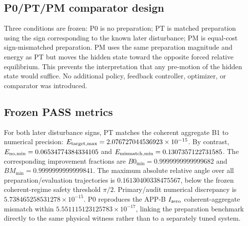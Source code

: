 \subsection{P0/PT/PM comparator design}

Three conditions are frozen: P0 is no preparation; PT is matched preparation using the sign corresponding to the known later disturbance; PM is equal-cost sign-mismatched preparation. PM uses the same preparation magnitude and energy as PT but moves the hidden state toward the opposite forced relative equilibrium. This prevents the interpretation that any pre-motion of the hidden state would suffice. No additional policy, feedback controller, optimizer, or comparator was introduced.

\subsection{Frozen PASS metrics}

For both later disturbance signs, PT matches the coherent aggregate B1 to numerical precision: $E_{\rm target,max}=2.076727044536923\times10^{-15}$. By contrast, $E_{\rm no,min}=0.06534774384334105$ and $E_{\rm mismatch,min}=0.1307357122731585$. The corresponding improvement fractions are $B0_{\min}=0.9999999999999682$ and $BM_{\min}=0.9999999999999841$. The maximum absolute relative angle over all preparation/evaluation trajectories is $0.16130400338475567$, below the frozen coherent-regime safety threshold $\pi/2$. Primary/audit numerical discrepancy is $5.738465258531278\times10^{-15}$. P0 reproduces the APP-B $I_{\rm zero}$ coherent-aggregate mismatch within $5.551115123125783\times10^{-17}$, linking the preparation benchmark directly to the same physical witness rather than to a separately tuned system.

